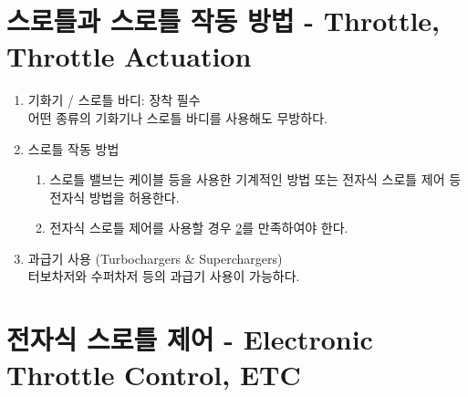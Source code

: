 \documentclass[final,a4paper,10pt]{report}
\begin{document}
\section{스로틀과 스로틀 작동 방법 - Throttle, Throttle Actuation} \label{section:스로틀 작동}
\begin{enumerate}
  \item 기화기 / 스로틀 바디: 장착 필수\\
    어떤 종류의 기화기나 스로틀 바디를 사용해도 무방하다.
    
  \item 스로틀 작동 방법
    \begin{enumerate}
      \item 스로틀 밸브는 케이블 등을 사용한 기계적인 방법 또는 전자식 스로틀 제어 등 전자식 방법을 허용한다.
      \item 전자식 스로틀 제어를 사용할 경우 \cref{section:전자식 스로틀 제어}를 만족하여야 한다.
    \end{enumerate}
    
  \item 과급기 사용 (Turbochargers \& Superchargers)\\
    터보차저와 수퍼차저 등의 과급기 사용이 가능하다.
\end{enumerate}

\section{전자식 스로틀 제어 - Electronic Throttle Control, ETC} \label{section:전자식 스로틀 제어}
\end{document}
